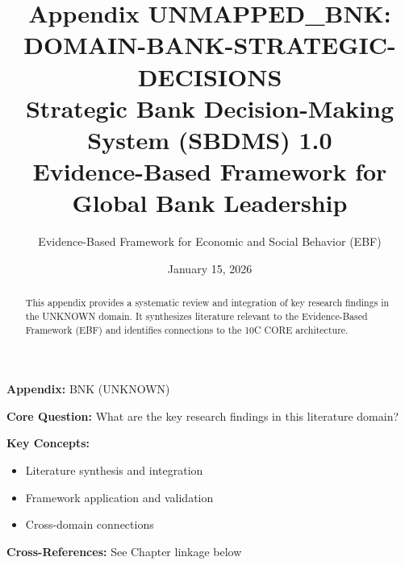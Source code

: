 \documentclass[11pt]{article}
\title{\textbf{Appendix UNMAPPED_BNK: DOMAIN-BANK-STRATEGIC-DECISIONS} \\ Strategic Bank Decision-Making System (SBDMS) 1.0 \\ Evidence-Based Framework for Global Bank Leadership}
\author{Evidence-Based Framework for Economic and Social Behavior (EBF)}
\date{January 15, 2026}
\begin{document}
\maketitle


\begin{tcolorbox}[colback=blue!5!white, colframe=blue!75!black,
    title=Quick Reference: Appendix UNMAPPED_BNK]
\textbf{Appendix:} BNK (UNKNOWN)

\textbf{Core Question:} What are the key research findings in this literature domain?

\textbf{Key Concepts:}
\begin{itemize}[nosep]
\item Literature synthesis and integration
\item Framework application and validation
\item Cross-domain connections
\end{itemize}

\textbf{Cross-References:} See Chapter linkage below
\end{tcolorbox}


\begin{abstract}
This appendix provides a systematic review and integration of key research findings
in the UNKNOWN domain. It synthesizes literature relevant to the Evidence-Based
Framework (EBF) and identifies connections to the 10C CORE architecture.
\end{abstract}
\end{document}
